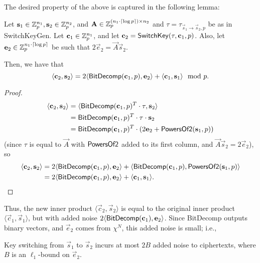     The desired property of the above is captured in the following lemma:
    \begin{lemma} \label{lem:switchkey}
        Let $\vec{s}_1 \in \Z_p^{n_1}, \vec{s}_2 \in \Z_p^{n_2}$, and $\vec{A} \in \Z_p^{(n_1 \cdot \lceil \log p \rceil) \times n_2}$ and $\tau = \tau_{\vec{s}_1 \to \vec{s}_2, p}$ be as in \textsf{SwitchKeyGen}.
        Let $\vec{c}_1 \in \Z_p^{n_1}$, and let $\vec{c}_2 = {\sf SwitchKey}(\tau, \vec{c}_1, p)$.
        Also, let $\vec{e}_2 \in \Z_p^{n_1 \cdot \lceil \log p \rceil}$ be such that $2 \vec{e}_2 = \vec{A} \vec{s}_2$.

        Then, we have that
        \[\langle \vec{c}_2, \vec{s}_2 \rangle = 2 \langle {\sf BitDecomp}(\vec{c}_1, p), \vec{e}_2 \rangle + \langle \vec{c}_1, \vec{s}_1 \rangle \mod p.\]
    \end{lemma}
    \begin{proof}
        \begin{align*}
            \langle \vec{c}_2, \vec{s}_2 \rangle &= \langle {\sf BitDecomp}(\vec{c}_1, p)^T \cdot \tau, \vec{s}_2 \rangle \\
            &= {\sf BitDecomp}(\vec{c}_1, p)^T \cdot \tau \cdot \vec{s}_2 \\
            &= {\sf BitDecomp}(\vec{c}_1, p)^T \cdot (2 \vec{e}_2 + {\sf PowersOf2}(\vec{s}_1, p))
        \end{align*}
        (since $\tau$ is equal to $\vec{A}$ with ${\sf PowersOf2}$ added to its first column, and $\vec{A} \vec{s}_2 = 2 \vec{e}_2$), so
        \begin{align*}
            \langle \vec{c}_2, \vec{s}_2 \rangle &= 2 \langle {\sf BitDecomp}(\vec{c}_1, p), \vec{e}_2 \rangle + \langle {\sf BitDecomp}(\vec{c}_1, p), {\sf PowersOf2}(\vec{s}_1, p) \rangle \\
            &= 2 \langle {\sf BitDecomp}(\vec{c}_1, p), \vec{e}_2 \rangle + \langle \vec{c}_1, \vec{s}_1 \rangle.
        \end{align*}
    \end{proof}

    Thus, the new inner product $\langle \vec{c}_2, \vec{s}_2 \rangle$ is equal to the original inner product $\langle \vec{c}_1, \vec{s}_1 \rangle$, but with added noise $2 \langle {\sf BitDecomp}(\vec{c}_1), \vec{e}_2 \rangle$. Since \textsf{BitDecomp} outputs binary vectors, and $\vec{e}_2$ comes from $\chi^N$,
    this added noise is small; i.e.,
    \begin{corollary}
        Key switching from $\vec{s}_1$ to $\vec{s}_2$ incurs at most $2B$ added noise to ciphertexts, where $B$ is an $\ell_1$-bound on $\vec{e}_2$.
    \end{corollary}

